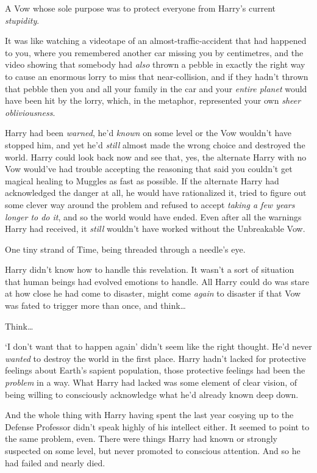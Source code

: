 A Vow whose sole purpose was to protect everyone from Harry's current \emph{stupidity}.

It was like watching a videotape of an almost-traffic-accident that had happened to you, where you remembered another car missing you by centimetres, and the video showing that somebody had \emph{also} thrown a pebble in exactly the right way to cause an enormous lorry to miss that near-collision, and if they hadn't thrown that pebble then you and all your family in the car and your \emph{entire planet} would have been hit by the lorry, which, in the metaphor, represented your own \emph{sheer obliviousness}.

Harry had been \emph{warned}, he'd \emph{known} on some level or the Vow wouldn't have stopped him, and yet he'd \emph{still} almost made the wrong choice and destroyed the world. Harry could look back now and see that, yes, the alternate Harry with no Vow would've had trouble accepting the reasoning that said you couldn't get magical healing to Muggles as fast as possible. If the alternate Harry had acknowledged the danger at all, he would have rationalized it, tried to figure out some clever way around the problem and refused to accept \emph{taking a few years longer to do it}, and so the world would have ended. Even after all the warnings Harry had received, it \emph{still} wouldn't have worked without the Unbreakable Vow.

One tiny strand of Time, being threaded through a needle's eye.

Harry didn't know how to handle this revelation. It wasn't a sort of situation that human beings had evolved emotions to handle. All Harry could do was stare at how close he had come to disaster, might come \emph{again} to disaster if that Vow was fated to trigger more than once, and think{\ldots}

Think{\ldots}

`I don't want that to happen again' didn't seem like the right thought. He'd never \emph{wanted} to destroy the world in the first place. Harry hadn't lacked for protective feelings about Earth's sapient population, those protective feelings had been the \emph{problem} in a way. What Harry had lacked was some element of clear vision, of being willing to consciously acknowledge what he'd already known deep down.

And the whole thing with Harry having spent the last year cosying up to the Defense Professor didn't speak highly of his intellect either. It seemed to point to the same problem, even. There were things Harry had known or strongly suspected on some level, but never promoted to conscious attention. And so he had failed and nearly died.

